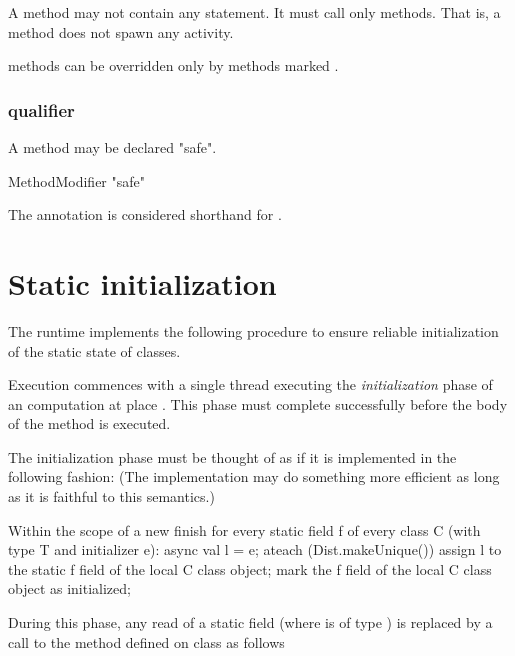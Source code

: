 A  method may not contain any 
statement. It must call only  methods. That is, a
 method does not spawn any activity.

 methods can be overridden only by methods marked .

\subsubsection{ qualifier}
\label{SafeAnnotation}
\label{SafeMethod}

A method may be declared \xcd"safe".

\begin{grammar}
  MethodModifier \: \xcd"safe"  
\end{grammar}

The  annotation is considered shorthand for .


\section{Static initialization}
\label{StaticInitialization}
The \Xten{} runtime implements the following procedure to ensure
reliable initialization of the static state of classes.


Execution commences with a single thread executing the
\emph{initialization} phase of an \Xten{} computation at place . This
phase must complete successfully before the body of the  method is
executed.

The initialization phase must be thought of as if it is implemented in
the following fashion: (The implementation may do something more
efficient as long as it is faithful to this semantics.)

\begin{xten}
Within the scope of a new finish
for every static field f of every class C 
   (with type T and initializer e):
async {
  val l = e; 
  ateach (Dist.makeUnique()) {
     assign l to the static f field of 
         the local C class object;
     mark the f field of the local C 
         class object as initialized;
  }
}
\end{xten}

During this phase, any read of a static field  (where  is of type )
is replaced by a call to the method  defined on class 
as follows

